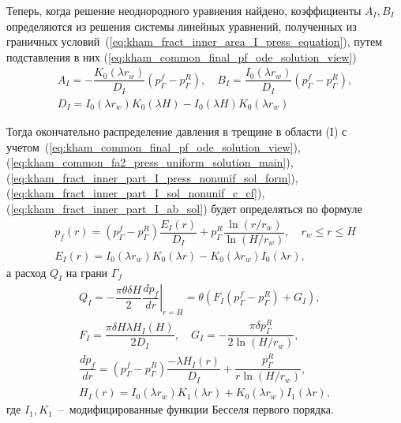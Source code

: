 \documentclass{article}
\begin{document}
Теперь, когда решение неоднородного уравнения найдено, коэффициенты $A_{I}, B_I$ определяются из решения системы
линейных уравнений, полученных из граничных условий~(\ref{eq:kham_fract_inner_area_I_press_equation}), путем подставления
в них (\ref{eq:kham_common_final_pf_ode_solution_view})
\begin{equation}
	\displaystyle
	\begin{gathered}
		A_I = - \dfrac{K_0 \left(\lambda r_w\right)}{D_I} \left(p^f_{\Gamma} - p^R_{\Gamma}\right), \quad
		B_I = \dfrac{I_0 \left(\lambda r_w\right)}{D_I} \left(p^f_{\Gamma} - p^R_{\Gamma}\right), \\[6pt]
		D_I = I_0 \left(\lambda r_w \right)K_0\left(\lambda H\right) - I_0\left(\lambda H\right) K_0\left(\lambda r_w\right)
	\end{gathered}
	\label{eq:kham_fract_inner_part_I_ab_sol}
\end{equation}

Тогда окончательно распределение давления в трещине в области (I) с учетом~(\ref{eq:kham_common_final_pf_ode_solution_view}),
(\ref{eq:kham_common_fa2_press_uniform_solution_main}), (\ref{eq:kham_fract_inner_part_I_press_nonunif_sol_form}),
(\ref{eq:kham_fract_inner_part_I_sol_nonunif_c_cf}),
(\ref{eq:kham_fract_inner_part_I_ab_sol}) будет определяться по формуле
\begin{equation}
	\displaystyle
	\begin{gathered}
		p_f\left(r\right) = \left(p^f_{\Gamma} - p^R_{\Gamma}\right)
		\dfrac{E_I\left(r\right)}{D_I}
		+ p^R_{\Gamma} \dfrac{\ln\left(r/r_w\right)}{\ln{\left(H/r_w\right)}}, \quad
		r_w \leq r \leq H \\[6pt]
		E_I\left(r\right) = I_0\left(\lambda r_w\right)K_0\left(\lambda r\right) - K_0\left(\lambda r_w\right)I_0\left(\lambda r\right),
	\end{gathered}
	\label{eq:kham_fract_inner_part_I_final_pf}
\end{equation}
а расход $Q_I$ на грани $\Gamma_f$
\begin{equation}
	\displaystyle
	\begin{gathered}
		Q_I = - \dfrac{\pi \theta \delta H}{2} \left. \dfrac{d p_f}{d r}\right|_{r=H} =
		\theta \left(    F_I \left(p^f_{\Gamma} - p^R_{\Gamma}\right) + G_I \right) , \\[8pt]
		F_I = \dfrac{\pi \delta H \lambda H_I\left(H\right)}{2 D_I}, \quad
		G_I = -\dfrac{\pi \delta p^R_{\Gamma}}{2 \ln{\left(H/r_w\right)}},  \\[8pt]
		\dfrac{d p_f}{d r} = \left(p^f_{\Gamma} - p^R_{\Gamma}\right)
		\dfrac{-\lambda H_I\left(r\right)}{D_I} +
		\dfrac{p^R_{\Gamma}}{r \ln{\left(H/r_w\right)}}, \\[8pt]
		H_I\left(r\right) =
		I_0\left(\lambda r_w\right)K_1\left(\lambda r\right) +
		K_0\left(\lambda r_w\right)I_1\left(\lambda r\right),
	\end{gathered}
	\label{eq:kham_hw_inner_part_I_Q}
\end{equation}
где $I_1, K_1$~--~модифицированные функции Бесселя первого порядка.
\end{document}
